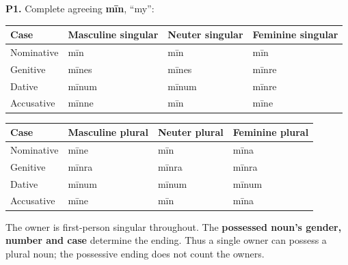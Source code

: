 \par\begin{minipage}{\linewidth}\raggedright
\textbf{P1.} Complete agreeing \textbf{mīn}, “my”:

\par\begingroup
\fontsize{10.5}{13.2}\selectfont
\setlength{\LTleft}{0pt}\setlength{\LTright}{\fill}
\noindent
\begin{tabular}{@{}>{\raggedright\arraybackslash}p{22.0mm}>{\raggedright\arraybackslash}p{31.188mm}>{\raggedright\arraybackslash}p{31.188mm}>{\raggedright\arraybackslash}p{31.188mm}@{}}
\toprule
\textbf{Case} & \textbf{Masculine singular} & \textbf{Neuter singular} & \textbf{Feminine singular} \\
\midrule
Nominative & mīn & mīn & mīn \\
Genitive & mīnes & mīnes & mīnre \\
Dative & mīnum & mīnum & mīnre \\
Accusative & mīnne & mīn & mīne \\
\bottomrule
\end{tabular}
\par\endgroup
\par\addvspace{5pt}
\par\begingroup
\fontsize{10.5}{13.2}\selectfont
\setlength{\LTleft}{0pt}\setlength{\LTright}{\fill}
\noindent
\begin{tabular}{@{}>{\raggedright\arraybackslash}p{22.0mm}>{\raggedright\arraybackslash}p{31.188mm}>{\raggedright\arraybackslash}p{31.188mm}>{\raggedright\arraybackslash}p{31.188mm}@{}}
\toprule
\textbf{Case} & \textbf{Masculine plural} & \textbf{Neuter plural} & \textbf{Feminine plural} \\
\midrule
Nominative & mīne & mīn & mīna \\
Genitive & mīnra & mīnra & mīnra \\
Dative & mīnum & mīnum & mīnum \\
Accusative & mīne & mīn & mīna \\
\bottomrule
\end{tabular}
\par\endgroup
The owner is first-person singular throughout. The \textbf{possessed noun’s gender, number and case} determine the ending. Thus a single owner can possess a plural noun; the possessive ending does not count the owners.

\end{minipage}\par\addvspace{4pt}


